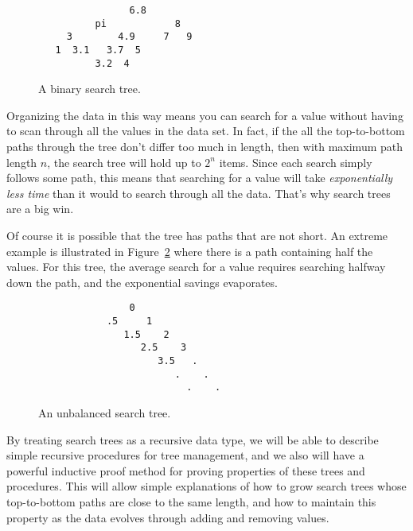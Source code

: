 \begin{figure}

\begin{center}
\begin{verbatim}
                6.8
          pi            8  
     3        4.9     7   9 
   1  3.1   3.7  5
          3.2  4 
\end{verbatim}
\end{center}

\caption{A binary search tree.}

\label{searchtree1}

\end{figure}

Organizing the data in this way means you can search for a value
without having to scan through all the values in the data set.  In
fact, if the all the top-to-bottom paths through the tree don't differ
too much in length, then with maximum path length $n$, the search tree
will hold up to $2^n$ items.  Since each search simply follows some
path, this means that searching for a value will take
\emph{exponentially less time} than it would to search through all the
data.  That's why search trees are a big win.


Of course it is possible that the tree has paths that are not short.
An extreme example is illustrated in Figure~\ref{unbalanced} where
there is a path containing half the values.  For this tree, the
average search for a value requires searching halfway down the path,
and the exponential savings evaporates.

\begin{figure}

\begin{center}
\begin{verbatim}
                0
            .5     1
               1.5    2
                  2.5    3
                     3.5   .
                        .    .
                          .    .
\end{verbatim}   
\end{center}

\caption{An unbalanced search tree.}

\label{unbalanced}

\end{figure}

By treating search trees as a recursive data type, we will be able to
describe simple recursive procedures for tree management, and we also
will have a powerful inductive proof method for proving properties of
these trees and procedures.  This will allow simple explanations of
how to grow search trees whose top-to-bottom paths are close to the
same length, and how to maintain this property as the data evolves
through adding and removing values.

